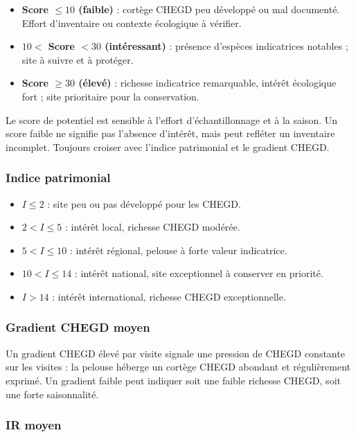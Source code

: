 \documentclass[11pt,a4paper]{article}
\begin{document}
\begin{itemize}
  \item \textbf{Score $\leq 10$ (faible)} : cortège CHEGD peu développé ou mal documenté. Effort d'inventaire ou contexte écologique à vérifier.
  \item \textbf{$10 <$ Score $< 30$ (intéressant)} : présence d'espèces indicatrices notables ; site à suivre et à protéger.
  \item \textbf{Score $\geq 30$ (élevé)} : richesse indicatrice remarquable, intérêt écologique fort ; site prioritaire pour la conservation.
\end{itemize}

\begin{warnbox}[Important]
  Le score de potentiel est sensible à l'effort d'échantillonnage et à la saison.
  Un score faible ne signifie pas l'absence d'intérêt, mais peut refléter un inventaire incomplet.
  Toujours croiser avec l'indice patrimonial et le gradient CHEGD.
\end{warnbox}

\subsubsection{Indice patrimonial}

\begin{itemize}
  \item $I \leq 2$ : site peu ou pas développé pour les CHEGD.
  \item $2 < I \leq 5$ : intérêt local, richesse CHEGD modérée.
  \item $5 < I \leq 10$ : intérêt régional, pelouse à forte valeur indicatrice.
  \item $10 < I \leq 14$ : intérêt national, site exceptionnel à conserver en priorité.
  \item $I > 14$ : intérêt international, richesse CHEGD exceptionnelle.
\end{itemize}

\subsubsection{Gradient CHEGD moyen}

Un gradient CHEGD élevé par visite signale une pression de CHEGD constante sur les visites :
la pelouse héberge un cortège CHEGD abondant et régulièrement exprimé. Un gradient faible
peut indiquer soit une faible richesse CHEGD, soit une forte saisonnalité.

\subsubsection{IR moyen}
\end{document}
